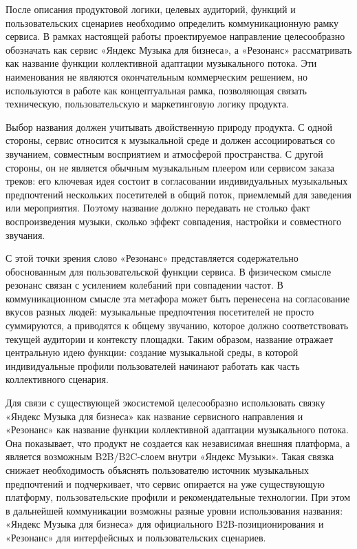 После описания продуктовой логики, целевых аудиторий, функций и пользовательских сценариев необходимо определить коммуникационную рамку сервиса. В рамках настоящей работы проектируемое направление целесообразно обозначать как сервис «Яндекс Музыка для бизнеса», а «Резонанс» рассматривать как название функции коллективной адаптации музыкального потока. Эти наименования не являются окончательным коммерческим решением, но используются в работе как концептуальная рамка, позволяющая связать техническую, пользовательскую и маркетинговую логику продукта.

Выбор названия должен учитывать двойственную природу продукта. С одной стороны, сервис относится к музыкальной среде и должен ассоциироваться со звучанием, совместным восприятием и атмосферой пространства. С другой стороны, он не является обычным музыкальным плеером или сервисом заказа треков: его ключевая идея состоит в согласовании индивидуальных музыкальных предпочтений нескольких посетителей в общий поток, приемлемый для заведения или мероприятия. Поэтому название должно передавать не столько факт воспроизведения музыки, сколько эффект совпадения, настройки и совместного звучания.

С этой точки зрения слово «Резонанс» представляется содержательно обоснованным для пользовательской функции сервиса. В физическом смысле резонанс связан с усилением колебаний при совпадении частот. В коммуникационном смысле эта метафора может быть перенесена на согласование вкусов разных людей: музыкальные предпочтения посетителей не просто суммируются, а приводятся к общему звучанию, которое должно соответствовать текущей аудитории и контексту площадки. Таким образом, название отражает центральную идею функции: создание музыкальной среды, в которой индивидуальные профили пользователей начинают работать как часть коллективного сценария.

Для связи с существующей экосистемой целесообразно использовать связку «Яндекс Музыка для бизнеса» как название сервисного направления и «Резонанс» как название функции коллективной адаптации музыкального потока. Она показывает, что продукт не создается как независимая внешняя платформа, а является возможным B2B/B2C-слоем внутри «Яндекс Музыки». Такая связка снижает необходимость объяснять пользователю источник музыкальных предпочтений и подчеркивает, что сервис опирается на уже существующую платформу, пользовательские профили и рекомендательные технологии. При этом в дальнейшей коммуникации возможны разные уровни использования названия: «Яндекс Музыка для бизнеса» для официального B2B-позиционирования и «Резонанс» для интерфейсных и пользовательских сценариев.

